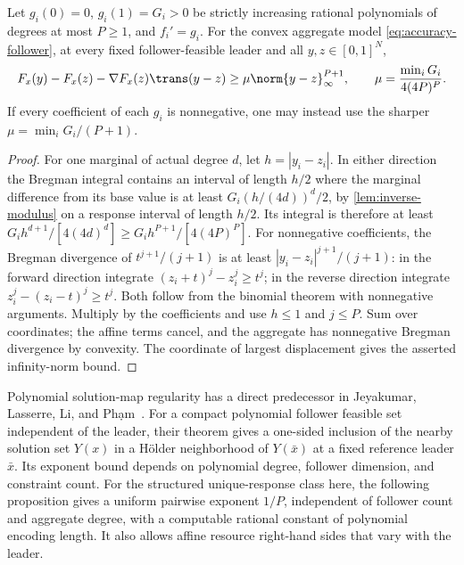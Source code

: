 \begin{lemma}
\label{lem:polynomial-bregman}
Let $g_i(0)=0$, $g_i(1)=G_i>0$ be strictly increasing rational
polynomials of degrees at most $P\ge1$, and $f_i'=g_i$. For the
convex aggregate model \eqref{eq:accuracy-follower}, at every fixed
follower-feasible leader and all $y,z\in[0,1]^N$,
\begin{equation}\label{eq:accuracy-bregman}
 F_x(y)-F_x(z)-\nabla F_x(z)\trans(y-z)
                 \ge\mu\norm{y-z}_\infty^{P+1},\qquad
 \mu=\frac{\min_iG_i}{4(4P)^P}.
\end{equation}
If every coefficient of each $g_i$ is nonnegative, one may instead
use the sharper $\mu=\min_iG_i/(P+1)$.
\end{lemma}
\begin{proof}
For one marginal of actual degree $d$, let $h=|y_i-z_i|$.
In either direction the Bregman integral contains an interval of length
$h/2$ where the marginal difference from its base value is at least
$G_i(h/(4d))^d/2$, by \cref{lem:inverse-modulus} on a response
interval of length $h/2$. Its integral is therefore at least
$G_ih^{d+1}/[4(4d)^d]\ge G_ih^{P+1}/[4(4P)^P]$.
For nonnegative coefficients, the Bregman divergence of
$t^{j+1}/(j+1)$ is at least $|y_i-z_i|^{j+1}/(j+1)$: in the
forward direction integrate $(z_i+t)^j-z_i^j\ge t^j$; in the
reverse direction integrate $z_i^j-(z_i-t)^j\ge t^j$.
Both follow from the binomial theorem with nonnegative arguments.
Multiply by the coefficients and use $h\le1$ and $j\le P$.
Sum over coordinates; the affine terms cancel, and the aggregate has
nonnegative Bregman divergence by convexity. The coordinate of largest
displacement gives the asserted infinity-norm bound.
\end{proof}

Polynomial solution-map regularity has a direct predecessor in
Jeyakumar, Lasserre, Li, and Ph\d{a}m~\cite[Theorem 2.3]{JeyakumarEtAl2016}.
For a compact polynomial follower feasible set independent of the leader,
their theorem gives a one-sided inclusion of the nearby solution set
$Y(x)$ in a H\"older neighborhood of $Y(\bar x)$ at a fixed reference
leader $\bar x$. Its exponent bound depends on polynomial degree,
follower dimension, and constraint count. For the structured unique-response
class here, the following proposition gives a uniform pairwise exponent
$1/P$, independent of follower count and aggregate degree, with a
computable rational constant of polynomial encoding length. It also allows
affine resource right-hand sides that vary with the leader.

